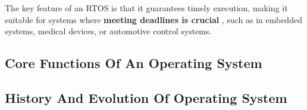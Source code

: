 The key feature of an RTOS is that it guarantees timely execution, making it suitable for systems where  \textbf{meeting deadlines is crucial} , such as in embedded systems, medical devices, or automotive 
control systems.
\subsection{Core Functions Of An Operating System}
\subsection{History And Evolution Of Operating System}
